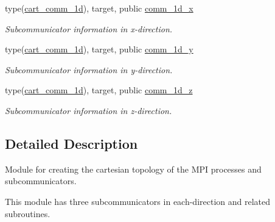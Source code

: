\begin{DoxyCompactItemize}
\mbox{\label{namespacempi__topology_a67d857c7a471473332bbfcac7682943c}} 
type(\hyperlink{structmpi__topology_1_1cart__comm__1d}{cart\+\_\+comm\+\_\+1d}), target, public \hyperlink{namespacempi__topology_a67d857c7a471473332bbfcac7682943c}{comm\+\_\+1d\+\_\+x}
\begin{DoxyCompactList}\small\item\em Subcommunicator information in x-\/direction. \end{DoxyCompactList}\item 
\mbox{\label{namespacempi__topology_a4f667ff8f1bbfd8075bd7629cba14c2d}} 
type(\hyperlink{structmpi__topology_1_1cart__comm__1d}{cart\+\_\+comm\+\_\+1d}), target, public \hyperlink{namespacempi__topology_a4f667ff8f1bbfd8075bd7629cba14c2d}{comm\+\_\+1d\+\_\+y}
\begin{DoxyCompactList}\small\item\em Subcommunicator information in y-\/direction. \end{DoxyCompactList}\item 
\mbox{\label{namespacempi__topology_a9d5db9f9841b438a50d1809aaf8f0efc}} 
type(\hyperlink{structmpi__topology_1_1cart__comm__1d}{cart\+\_\+comm\+\_\+1d}), target, public \hyperlink{namespacempi__topology_a9d5db9f9841b438a50d1809aaf8f0efc}{comm\+\_\+1d\+\_\+z}
\begin{DoxyCompactList}\small\item\em Subcommunicator information in z-\/direction. \end{DoxyCompactList}\end{DoxyCompactItemize}


\subsection{Detailed Description}
Module for creating the cartesian topology of the M\+PI processes and subcommunicators. 

This module has three subcommunicators in each-\/direction and related subroutines. 